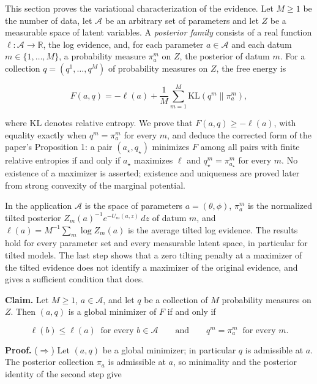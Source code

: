 \documentclass[11pt,a4paper]{report}
\begin{document}
This section proves the variational characterization of the evidence. Let \(M\ge1\) be the number of data, let \(\mathcal A\) be an arbitrary set of parameters and let \(Z\) be a measurable space of latent variables. A \emph{posterior family} consists of a real function \(\ell:\mathcal A\to\mathbb R\), the log evidence, and, for each parameter \(a\in\mathcal A\) and each datum \(m\in\{1,\dots,M\}\), a probability measure \(\pi_a^m\) on \(Z\), the posterior of datum \(m\). For a collection \(q=(q^1,\dots,q^M)\) of probability measures on \(Z\), the free energy is


\[F(a,q)=-\ell(a)+\frac1M\sum_{m=1}^M\mathrm{KL}(q^m\|\pi_a^m),\]


where \(\mathrm{KL}\) denotes relative entropy. We prove that \(F(a,q)\ge-\ell(a)\), with equality exactly when \(q^m=\pi_a^m\) for every \(m\), and deduce the corrected form of the paper's Proposition 1: a pair \((a_\star,q_\star)\) minimizes \(F\) among all pairs with finite relative entropies if and only if \(a_\star\) maximizes \(\ell\) and \(q_\star^m=\pi_{a_\star}^m\) for every \(m\). No existence of a maximizer is asserted; existence and uniqueness are proved later from strong convexity of the marginal potential.




In the application \(\mathcal A\) is the space of parameters \(a=(\theta,\phi)\), \(\pi_a^m\) is the normalized tilted posterior \(Z_m(a)^{-1}e^{-U_m(a,z)}\,dz\) of datum \(m\), and \(\ell(a)=M^{-1}\sum_m\log Z_m(a)\) is the average tilted log evidence. The results hold for every parameter set and every measurable latent space, in particular for tilted models. The last step shows that a zero tilting penalty at a maximizer of the tilted evidence does not identify a maximizer of the original evidence, and gives a sufficient condition that does.



\textbf{Claim.} Let \(M\ge1\), \(a\in\mathcal A\), and let \(q\) be a collection of \(M\) probability measures on \(Z\). Then \((a,q)\) is a global minimizer of \(F\) if and only if


\[\ell(b)\le\ell(a)\ \text{ for every }b\in\mathcal A\qquad\text{and}\qquad q^m=\pi_a^m\ \text{ for every }m.\]


\textbf{Proof.} (\(\Rightarrow\)) Let \((a,q)\) be a global minimizer; in particular \(q\) is admissible at \(a\). The posterior collection \(\pi_a\) is admissible at \(a\), so minimality and the posterior identity of the second step give
\end{document}

